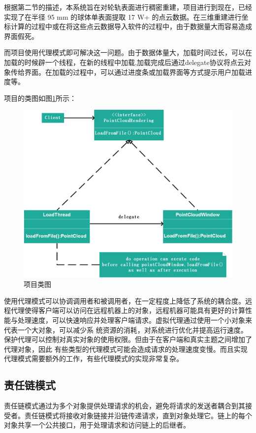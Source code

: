 \documentclass[article]{BJTU-thesis}
\begin{document}
根据第二节的描述，本系统旨在对轮轨表面进行稠密重建，项目进行到现在，已经实现了在半径 95 mm 的球体单表面提取 17 W+ 的点云数据。在三维重建进行坐标计算的过程中或在将这些点云数据导入软件的过程中，由于数据量大而容易造成界面假死。

而项目使用代理模式即可解决这一问题。由于数据体量大，加载时间过长，可以在加载的时候辟一个线程，在新的线程中加载,加载完成后通过delegate协议将点云对象传给界面。在加载的过程中，可以通过进度条或加载界面等方式提示用户加载进度等。

项目的类图如图\ref{fig:fig9}所示：

\begin{figure}[!htbp]
	\centering
	\includegraphics[scale=0.5]{19.png}
	\caption{项目类图}
	\label{fig:fig9}
\end{figure}

使用代理模式可以协调调用者和被调用者，在一定程度上降低了系统的耦合度。远程代理使得客户端可以访问在远程机器上的对象，远程机器可能具有更好的计算性能与处理速度，可以快速响应并处理客户端请求。虚拟代理通过使用一个小对象来代表一个大对象，可以减少系 统资源的消耗，对系统进行优化并提高运行速度。保护代理可以控制对真实对象的使用权限。但由于在客户端和真实主题之间增加了代理对象，因此 有些类型的代理模式可能会造成请求的处理速度变慢。而且实现代理模式需要额外的工作，有些代理模式的实现非常复杂。


\subsection{责任链模式}
	责任链模式通过为多个对象提供处理请求的机会，避免将请求的发送者耦合到其接受者。责任链模式将接收对象链接并沿链传递请求，直到对象处理它。链上的每个对象共享一个公共接口，用于处理请求和访问链上的后继者。
	
\end{document}
